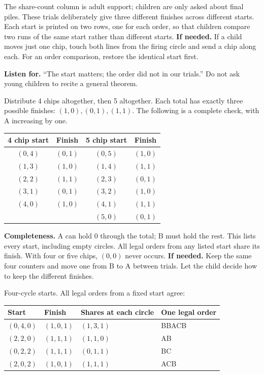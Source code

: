 \documentclass[11pt,letterpaper]{article}
\newcommand{\prob}[2]{\par\vspace{5pt}{\large\bfseries #1}\par #2}
\newcommand{\hint}[1]{\textbf{If needed.} #1\par}
\newcommand{\notice}[1]{\textbf{Listen for.} #1\par}
\begin{document}
The share-count column is adult support; children are only asked about final piles. These trials deliberately give three different finishes across different starts. Each start is printed on two rows, one for each order, so that children compare two runs of the same start rather than different starts.
\hint{If a child moves just one chip, touch both lines from the firing circle and send a chip along each. For an order comparison, restore the identical start first.}
\notice{``The start matters; the order did not in our trials.'' Do not ask young children to recite a general theorem.}
\prob{Problem 2}{Distribute 4 chips altogether, then 5 altogether. Each total has exactly three possible finishes: $(1,0),(0,1),(1,1)$. The following is a complete check, with A increasing by one.}
\begin{center}\begin{tabular}{cc|cc}\toprule
4 chip start & Finish & 5 chip start & Finish\\\midrule
$(0,4)$&$(0,1)$&$(0,5)$&$(1,0)$\\
$(1,3)$&$(1,0)$&$(1,4)$&$(1,1)$\\
$(2,2)$&$(1,1)$&$(2,3)$&$(0,1)$\\
$(3,1)$&$(0,1)$&$(3,2)$&$(1,0)$\\
$(4,0)$&$(1,0)$&$(4,1)$&$(1,1)$\\
&&$(5,0)$&$(0,1)$\\\bottomrule\end{tabular}\end{center}
\textbf{Completeness.} A can hold 0 through the total; B must hold the rest. This lists every start, including empty circles. All legal orders from any listed start share its finish. With four or five chips, $(0,0)$ never occurs.
\hint{Keep the same four counters and move one from B to A between trials. Let the child decide how to keep the different finishes.}
\prob{Problem 3}{Four-cycle starts. All legal orders from a fixed start agree:}
\begin{center}\begin{tabular}{llll}\toprule Start & Finish & Shares at each circle & One legal order\\\midrule
$(0,4,0)$ & $(1,0,1)$ & $(1,3,1)$ & BBACB\\
$(2,2,0)$ & $(1,1,1)$ & $(1,1,0)$ & AB\\
$(0,2,2)$ & $(1,1,1)$ & $(0,1,1)$ & BC\\
$(2,0,2)$ & $(1,0,1)$ & $(1,1,1)$ & ACB\\
\bottomrule\end{tabular}\end{center}
\end{document}

